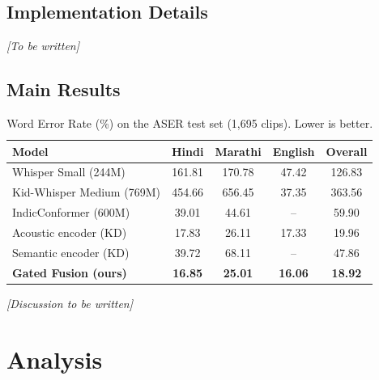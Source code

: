 \documentclass{article} %
\begin{document}
\subsection{Implementation Details}
\textit{[To be written]}

\subsection{Main Results}

\begin{table}[h!]
\caption{Word Error Rate (\%) on the ASER test set (1,695 clips). Lower is better.}
\label{tab:main_results}
\begin{center}
\begin{tabular}{lcccc}
\toprule
\textbf{Model} & \textbf{Hindi} & \textbf{Marathi} & \textbf{English} & \textbf{Overall} \\
\midrule
Whisper Small (244M) & 161.81 & 170.78 & 47.42 & 126.83 \\
Kid-Whisper Medium (769M) & 454.66 & 656.45 & 37.35 & 363.56 \\
IndicConformer (600M) & 39.01 & 44.61 & -- & 59.90 \\
\midrule
Acoustic encoder (KD) & 17.83 & 26.11 & 17.33 & 19.96 \\
Semantic encoder (KD) & 39.72 & 68.11 & -- & 47.86 \\
\midrule
\textbf{Gated Fusion (ours)} & \textbf{16.85} & \textbf{25.01} & \textbf{16.06} & \textbf{18.92} \\
\bottomrule
\end{tabular}
\end{center}
\end{table}

\textit{[Discussion to be written]}

\section{Analysis}
\label{sec:analysis}
\end{document}

